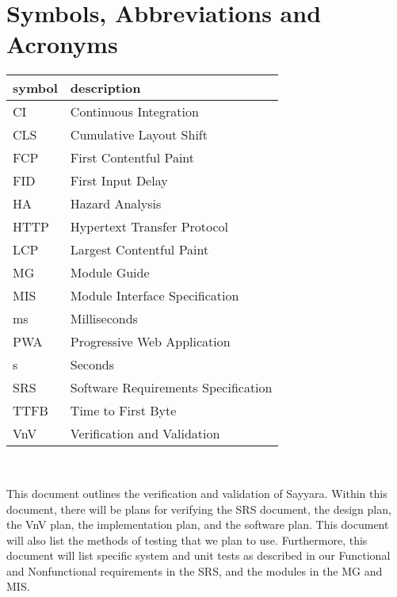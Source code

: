 \documentclass[12pt, titlepage]{article}
\begin{document}
\newpage

\tableofcontents

\listoftables

\listoffigures

\newpage

\section{Symbols, Abbreviations and Acronyms}

\renewcommand{\arraystretch}{1.2}
\begin{tabular}{l l}
	\toprule
	\textbf{symbol} & \textbf{description}                \\
	\midrule
	CI              & Continuous Integration              \\
	CLS             & Cumulative Layout Shift             \\
	FCP             & First Contentful Paint              \\
	FID             & First Input Delay                   \\
	HA              & Hazard Analysis                     \\
	HTTP            & Hypertext Transfer Protocol         \\
	LCP             & Largest Contentful Paint            \\
	MG              & Module Guide                        \\
	MIS             & Module Interface Specification      \\
	ms              & Milliseconds                        \\
	PWA             & Progressive Web Application         \\
	s               & Seconds                             \\
	SRS             & Software Requirements Specification \\
	TTFB            & Time to First Byte                  \\
	VnV             & Verification and Validation         \\
	\bottomrule
\end{tabular}\\

\newpage


This document outlines the verification and validation of Sayyara. Within this document, there will
be plans for verifying the SRS document, the design plan, the VnV plan, the implementation plan,
and the software plan. This document will also list the methods of testing that we plan to use.
Furthermore, this document will list specific system and unit tests as described in our Functional
and Nonfunctional requirements in the SRS, and the modules in the MG and MIS.
\end{document}
